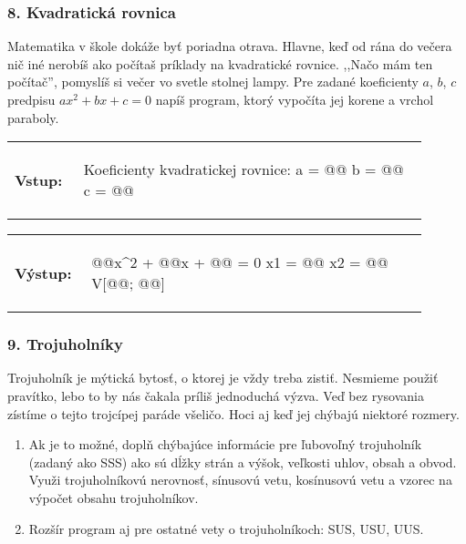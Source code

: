 \subsubsection*{8. Kvadratická rovnica}
Matematika v škole dokáže byť poriadna otrava. Hlavne, keď od rána do večera nič iné nerobíš ako počítaš príklady na kvadratické rovnice. ,,Načo mám ten počítač'', pomyslíš si večer vo svetle stolnej lampy. Pre zadané koeficienty $a$, $b$, $c$ predpisu $ax^2 + bx + c = 0$ napíš program, ktorý vypočíta jej korene a vrchol paraboly.

\begin{tabular}{@{}p{0.15\linewidth}p{0.75\linewidth}}
\textbf{\small Vstup:} &
\vspace{-3em}
\begin{code}
Koeficienty kvadratickej rovnice:
a = @\fbox{\phantom{vstup}}@
b = @\fbox{\phantom{vstup}}@
c = @\fbox{\phantom{vstup}}@
\end{code}
\end{tabular}

\vspace{-2em}
\begin{tabular}{@{}p{0.15\linewidth}p{0.75\linewidth}}
\textbf{\small Výstup:} &
\vspace{-3em}
\begin{code}
@\fbox{\phantom{a}}@x^2 + @\fbox{\phantom{b}}@x + @\fbox{\phantom{c}}@ = 0
x1 = @\fbox{\phantom{abc}}@
x2 = @\fbox{\phantom{abc}}@
V[@\fbox{\phantom{abc}}@; @\fbox{\phantom{abc}}@]
\end{code}
\end{tabular}
\vspace{-2em}


\subsubsection*{9. Trojuholníky}
Trojuholník je mýtická bytosť, o ktorej je vždy treba zistiť. Nesmieme použiť pravítko, lebo to by nás čakala príliš jednoduchá výzva. Veď bez rysovania zístíme o tejto trojcípej paráde všeličo. Hoci aj keď jej chýbajú niektoré rozmery.

\begin{enumerate}[label=\alph*)]
\item Ak je to možné, doplň chýbajúce informácie pre ľubovoľný trojuholník (zadaný ako SSS) ako sú dĺžky strán a výšok, veľkosti uhlov, obsah a obvod. Využi trojuholníkovú nerovnosť, sínusovú vetu, kosínusovú vetu a vzorec na výpočet obsahu trojuholníkov.
\item Rozšír program aj pre ostatné vety o trojuholníkoch: SUS, USU, UUS.
\end{enumerate}

